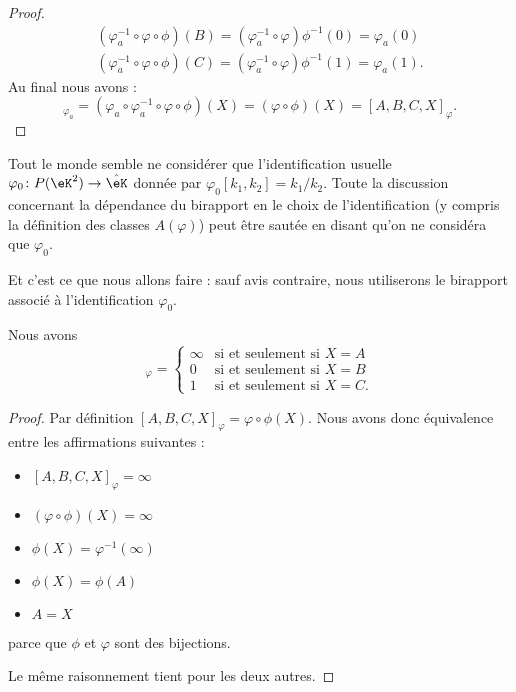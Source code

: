 \begin{proof}
\begin{subequations}
\begin{align}
            (\varphi_a^{-1}\circ\varphi\circ\phi)(B)=(\varphi_a^{-1}\circ\varphi)\phi^{-1}(0)=\varphi_a(0)\\
            (\varphi_a^{-1}\circ\varphi\circ\phi)(C)=(\varphi_a^{-1}\circ\varphi)\phi^{-1}(1)=\varphi_a(1).
        \end{align}
    \end{subequations}
    Au final nous avons :
    \begin{equation}
        [A,B,C,X]_{\varphi_a}=(\varphi_a\circ\varphi_a^{-1}\circ\varphi\circ\phi)(X)=(\varphi\circ\phi)(X)=[A,B,C,X]_{\varphi}.
    \end{equation}
\end{proof}

\begin{remark}
    Tout le monde semble ne considérer que l'identification usuelle \( \varphi_0\colon P(\eK^2)\to \hat\eK\) donnée par \( \varphi_0[k_1,k_2]=k_1/k_2\). Toute la discussion concernant la dépendance du birapport en le choix de l'identification (y compris la définition des classes \( A(\varphi)\)) peut être sautée en disant qu'on ne considéra que \( \varphi_0\).

    Et c'est ce que nous allons faire : sauf avis contraire, nous utiliserons le birapport associé à l'identification \( \varphi_0\).
\end{remark}

\begin{lemma}        \label{LEMooCOFTooVGKdVO}
    Nous avons
    \begin{equation}
        [A,B,C,X]_{\varphi}=\begin{cases}
            \infty    &   \text{si et seulement si } X=A\\
            0    &    \text{si et seulement si }X=B\\
            1    &    \text{si et seulement si }X=C.
        \end{cases}
    \end{equation}
\end{lemma}

\begin{proof}
    Par définition \( [A,B,C,X]_{\varphi}=\varphi\circ\phi(X)\). Nous avons donc équivalence entre les affirmations suivantes :
    \begin{itemize}
        \item \( [A,B,C,X]_{\varphi}=\infty\)
        \item \( (\varphi\circ\phi)(X)=\infty\)
        \item \( \phi(X)=\varphi^{-1}(\infty)\)
        \item \( \phi(X)=\phi(A)\)
        \item \( A=X\)
    \end{itemize}
    parce que \( \phi\) et \( \varphi\) sont des bijections.

    Le même raisonnement tient pour les deux autres.
\end{proof}

